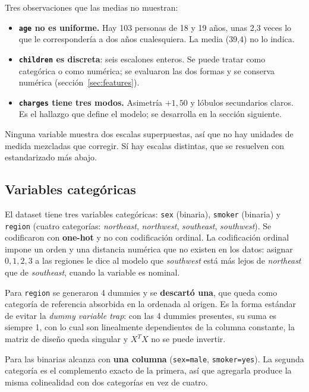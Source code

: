 \documentclass[11pt,a4paper]{article}
\begin{document}
Tres observaciones que las medias no muestran:

\begin{itemize}
  \item \textbf{\texttt{age} no es uniforme.} Hay 103 personas de 18 y 19 años, unas
        2{,}3 veces lo que le correspondería a dos años cualesquiera. La media (39{,}4) no lo
        indica.
  \item \textbf{\texttt{children} es discreta}: seis escalones enteros. Se puede tratar como
        categórica o como numérica; se evaluaron las dos formas y se conserva numérica
        (sección~\ref{sec:features}).
  \item \textbf{\texttt{charges} tiene tres modos.} Asimetría $+1{,}50$ y lóbulos secundarios
        claros. Es el hallazgo que define el modelo; se desarrolla en la sección siguiente.
\end{itemize}

Ninguna variable muestra dos escalas superpuestas, así que no hay unidades de medida mezcladas
que corregir. Sí hay escalas distintas, que se resuelven con estandarizado más abajo.

\subsection{Variables categóricas}

El dataset tiene tres variables categóricas: \texttt{sex} (binaria), \texttt{smoker} (binaria)
y \texttt{region} (cuatro categorías: \emph{northeast}, \emph{northwest}, \emph{southeast},
\emph{southwest}). Se codificaron con \textbf{one-hot} y no con codificación ordinal. La
codificación ordinal impone un orden y una distancia numérica que no existen en los datos:
asignar $0,1,2,3$ a las regiones le dice al modelo que \emph{southwest} está más lejos de
\emph{northeast} que de \emph{southeast}, cuando la variable es nominal.

Para \texttt{region} se generaron 4 dummies y se \textbf{descartó una}, que queda como
categoría de referencia absorbida en la ordenada al origen. Es la forma estándar de evitar la
\emph{dummy variable trap}: con las 4 dummies presentes, su suma es siempre 1, con lo cual son
linealmente dependientes de la columna constante, la matriz de diseño queda singular y
$X^{T}X$ no se puede invertir.

Para las binarias alcanza con \textbf{una columna} (\texttt{sex=male}, \texttt{smoker=yes}).
La segunda categoría es el complemento exacto de la primera, así que agregarla produce la
misma colinealidad con dos categorías en vez de cuatro.
\end{document}
